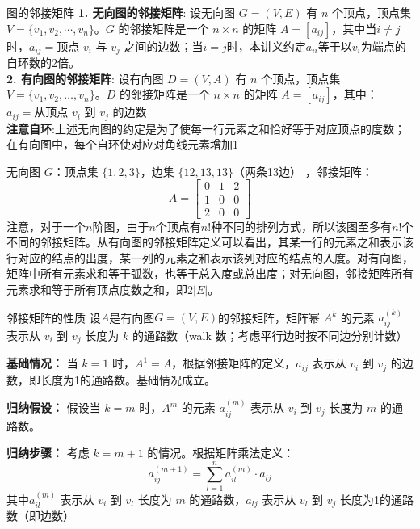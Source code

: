\begin{definition}{图的邻接矩阵}{}
\textbf{1. 无向图的邻接矩阵}:
设无向图 $G = (V, E)$ 有 $n$ 个顶点，顶点集 $V = \{v_1, v_2, \cdots, v_n\}$。$G$ 的邻接矩阵是一个 $n \times n$ 的矩阵 $A = [a_{ij}]$，其中当$i\neq j$时，$a_{ij} = \text{顶点 } v_i \text{ 与 } v_j \text{ 之间的边数}$；当$i=j$时，本讲义约定$a_{ii}$等于以$v_i$为端点的自环数的2倍。\\
\textbf{2. 有向图的邻接矩阵}:
设有向图 $D = (V, A)$ 有 $n$ 个顶点，顶点集 $V = \{v_1, v_2, \ldots, v_n\}$。$D$ 的邻接矩阵是一个 $n \times n$ 的矩阵 $A = [a_{ij}]$，其中：$a_{ij} = \text{从顶点 } v_i \text{ 到 } v_j \text{ 的边数}$\\
\textbf{注意自环}:上述无向图的约定是为了使每一行元素之和恰好等于对应顶点的度数；在有向图中，每个自环使对应对角线元素增加1
\end{definition}
无向图 $G$：顶点集 $\{1,2,3\}$，边集 $\{12, 13, 13\}$（两条13边） ，邻接矩阵：\[
A = \begin{bmatrix}
0 & 1 & 2 \\
1 & 0 & 0 \\
2 & 0 & 0
\end{bmatrix}\]
注意，对于一个$n$阶图，由于$n$个顶点有$n!$种不同的排列方式，所以该图至多有$n!$个不同的邻接矩阵。从有向图的邻接矩阵定义可以看出，其某一行的元素之和表示该行对应的结点的出度，某一列的元素之和表示该列对应的结点的入度。对有向图，矩阵中所有元素求和等于弧数，也等于总入度或总出度；对无向图，邻接矩阵所有元素求和等于所有顶点度数之和，即$2|E|$。
\begin{theorem}{邻接矩阵的性质}{}
设$A$是有向图$G=(V,E)$的邻接矩阵，矩阵幂 $A^k$ 的元素 $a_{ij}^{(k)}$ 表示从 $v_i$ 到 $v_j$ 长度为 $k$ 的通路数（walk 数；考虑平行边时按不同边分别计数）
\end{theorem}
\textbf{基础情况：} 当 $k=1$ 时，$A^1 = A$，根据邻接矩阵的定义，$a_{ij}$ 表示从 $v_i$ 到 $v_j$ 的边数，即长度为1的通路数。基础情况成立。

\textbf{归纳假设：} 假设当 $k = m$ 时，$A^m$ 的元素 $a_{ij}^{(m)}$ 表示从 $v_i$ 到 $v_j$ 长度为 $m$ 的通路数。

\textbf{归纳步骤：} 考虑 $k = m+1$ 的情况。根据矩阵乘法定义：
\[
a_{ij}^{(m+1)} = \sum_{l=1}^{n} a_{il}^{(m)} \cdot a_{lj}
\]
其中$a_{il}^{(m)}$ 表示从 $v_i$ 到 $v_l$ 长度为 $m$ 的通路数，$a_{lj}$ 表示从 $v_l$ 到 $v_j$ 长度为1的通路数（即边数）

